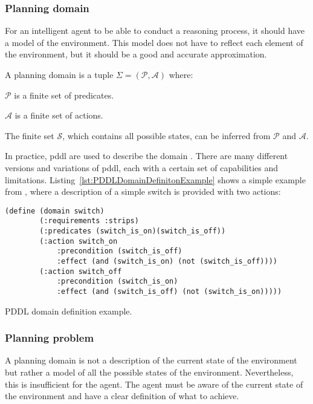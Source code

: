 \subsubsection{Planning domain}

For an intelligent agent to be able to conduct a reasoning process, 
it should have a model of the environment. 
This model does not have to reflect each element of the environment, 
but it should be a good and accurate approximation.
\begin{Tdef}

    A planning domain is a tuple $\Sigma= (\mathcal{P}, \mathcal{A})$ where:
    \vspace{-0.5em}
    \begin{compactitem}
        \item 
        $\mathcal{P}$ is a finite set of predicates.
        \item 
        $\mathcal{A}$ is a finite set of actions.
        \item 
        The finite set $\mathcal{S}$, which contains all possible states, can be inferred from $\mathcal{P}$ and $\mathcal{A}$.
    \end{compactitem}
    \vspace{-0.5em}
\end{Tdef}

In practice, \gls{pddl} are used to describe the domain \cite{aeronautiques1998pddl}. There are many different versions and variations of \gls{pddl}, each with a certain set of capabilities and limitations. 
Listing~\ref{lst:PDDLDomainDefinitonExample} shows a simple example from \cite{IntroductionPlanningDomainhaslum2019}, where a description of a simple switch is provided with two actions:

\begin{Listing}
    \begin{lstlisting}[language=PDDL]
    (define (domain switch)
        (:requirements :strips)
        (:predicates (switch_is_on)(switch_is_off))
        (:action switch_on
            :precondition (switch_is_off)
            :effect (and (switch_is_on) (not (switch_is_off))))
        (:action switch_off
            :precondition (switch_is_on)
            :effect (and (switch_is_off) (not (switch_is_on)))))
  \end{lstlisting}
    \caption{PDDL domain definition example.}
    \label{lst:PDDLDomainDefinitonExample}
\end{Listing}

\subsubsection{Planning problem}
A planning domain is not a description of the current state of the environment 
but rather a model of all the possible states of the environment. 
Nevertheless, this is insufficient for the agent. The agent must be aware 
of the current state of the environment and have a clear definition 
of what to achieve.

